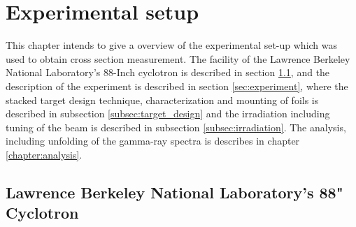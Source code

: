 \chapter{Experimental setup}
This chapter intends to give a overview of the experimental set-up which was used to obtain cross section measurement. The facility of the Lawrence Berkeley National Laboratory's 88-Inch cyclotron is described in section \ref{sec:LBNL-88}, and the description of the experiment is described in section \ref{sec:experiment}, where the stacked target design technique, characterization and mounting of foils is described in subsection \ref{subsec:target_design} and the irradiation including tuning of the beam is described in subsection \ref{subsec:irradiation}. The analysis, including unfolding of the gamma-ray spectra is describes in chapter \ref{chapter:analysis}. 


\section{Lawrence Berkeley National Laboratory's 88" Cyclotron} \label{sec:LBNL-88}

